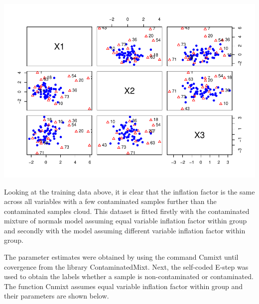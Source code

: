 \documentclass[
]{article}
\newenvironment{Shaded}{\begin{snugshade}}{\end{snugshade}}
\newcommand{\AttributeTok}[1]{\textcolor[rgb]{0.77,0.63,0.00}{#1}}
\newcommand{\DecValTok}[1]{\textcolor[rgb]{0.00,0.00,0.81}{#1}}
\newcommand{\FunctionTok}[1]{\textcolor[rgb]{0.00,0.00,0.00}{#1}}
\newcommand{\NormalTok}[1]{#1}
\newcommand{\SpecialCharTok}[1]{\textcolor[rgb]{0.00,0.00,0.00}{#1}}
\newcommand{\StringTok}[1]{\textcolor[rgb]{0.31,0.60,0.02}{#1}}
\begin{document}
\begin{Shaded}
\end{Shaded}

\includegraphics{DifferentVarInflationFactors_files/figure-latex/plotA_training-1.pdf}

Looking at the training data above, it is clear that the inflation
factor is the same across all variables with a few contaminated samples
further than the contaminated samples cloud. This dataset is fitted
firstly with the contaminated mixture of normals model assuming equal
variable inflation factor within group and secondly with the model
assuming different variable inflation factor within group.

The parameter estimates were obtained by using the command Cnmixt until
covergence from the library ContaminatedMixt. Next, the self-coded
E-step was used to obtain the labels whether a sample is
non-contaminated or contaminated. The function Cnmixt assumes equal
variable inflation factor within group and their parameters are shown
below.
\end{document}
